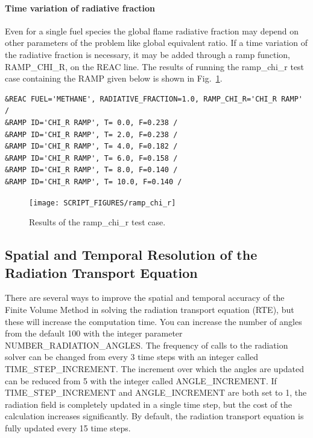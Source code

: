 \documentclass[11pt]{book}
\begin{document}
\paragraph{Time variation of radiative fraction}

Even for a single fuel species the global flame radiative fraction may depend on other parameters of the problem like global equivalent ratio.  If a time variation of the radiative fraction is necessary, it may be added through a ramp function, {\ct RAMP\_CHI\_R}, on the {\ct REAC} line. The results of running the {\ct ramp\_chi\_r} test case containing the {\ct RAMP} given below is shown in Fig.~\ref{ramp_chi}.

\begin{lstlisting}
&REAC FUEL='METHANE', RADIATIVE_FRACTION=1.0, RAMP_CHI_R='CHI_R RAMP' /
&RAMP ID='CHI_R RAMP', T= 0.0, F=0.238 /
&RAMP ID='CHI_R RAMP', T= 2.0, F=0.238 /
&RAMP ID='CHI_R RAMP', T= 4.0, F=0.182 /
&RAMP ID='CHI_R RAMP', T= 6.0, F=0.158 /
&RAMP ID='CHI_R RAMP', T= 8.0, F=0.140 /
&RAMP ID='CHI_R RAMP', T= 10.0, F=0.140 /
\end{lstlisting}

\begin{figure}[h]
\begin{center}
\texttt{[image: SCRIPT\_FIGURES/ramp\_chi\_r]}
\caption[Results of the {\ct ramp\_chi\_r} test case]{Results of the {\ct  ramp\_chi\_r} test case.}
\label{ramp_chi}
\end{center}
\end{figure}

\subsection{Spatial and Temporal Resolution of the Radiation Transport Equation}

\label{info:RADI_Resolution}

There are several ways to improve the spatial and temporal accuracy of the Finite Volume Method in solving the radiation transport equation (RTE), but these will increase the computation time. You can increase the number of angles from the default 100 with the integer parameter {\ct NUMBER\_RADIATION\_ANGLES}. The frequency of calls to the radiation solver can be changed from every 3 time steps with an integer called {\ct TIME\_STEP\_INCREMENT}. The increment over which the angles are updated can be reduced from 5 with the integer called {\ct ANGLE\_INCREMENT}. If {\ct TIME\_STEP\_INCREMENT} and {\ct ANGLE\_INCREMENT} are both set to 1, the radiation field is completely updated in a single time step, but the cost of the calculation increases significantly. By default, the radiation transport equation is fully updated every 15 time steps.
\end{document}
